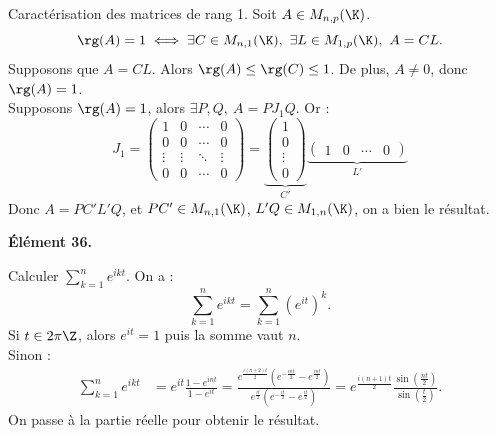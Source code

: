 \documentclass[11pt]{article}
\begin{document}
\begin{prop}{Caractérisation des matrices de rang 1.}{}
    Soit $A\in M_{n,p}(\K)$.
    \begin{equation*}
        \rg(A)=1 \iff \exists C \in M_{n,1}(\K), ~ \exists L \in M_{1,p}(\K), ~ A=CL.
    \end{equation*}
    \tcblower
    \boxed{\la} Supposons que $A=CL$. Alors $\rg(A)\leq \rg(C)\leq 1$. De plus, $A\neq0$, donc $\rg(A)=1$.\\
    \boxed{\ra} Supposons $\rg(A)=1$, alors $\exists P,Q, ~ A = PJ_1Q$. Or :
    \begin{equation*}
        J_1=\begin{pmatrix}
            1 & 0 & \cdots & 0\\
            0 & 0 & \cdots & 0\\
            \vdots & \vdots & \ddots & \vdots\\
            0 & 0 & \cdots & 0
        \end{pmatrix} = \underbrace{\begin{pmatrix}
            1\\
            0\\
            \vdots\\
            0
        \end{pmatrix}}_{C'}\underbrace{\begin{pmatrix}
            1 & 0 & \cdots & 0
        \end{pmatrix}}_{L'}
    \end{equation*}
    Donc $A=PC'L'Q$, et $PC'\in M_{n,1}(\K)$, $L'Q\in M_{1,n}(\K)$, on a bien le résultat. 
\end{prop}

\vspace*{-0.4cm}

\bf{Élément 36.}

\begin{exercice}{}{}
    Calculer $\sum_{k=1}^ne^{ikt}$.
    \tcblower
    On a :
    \begin{equation*}
        \sum_{k=1}^ne^{ikt} = \sum_{k=1}^n(e^{it})^k.
    \end{equation*}
    Si $t\in2\pi\Z$, alors $e^{it}=1$ puis la somme vaut $n$.\\
    Sinon :
    \begin{align*}
        \sum_{k=1}^ne^{ikt} &= e^{it}\frac{1-e^{int}}{1-e^{it}} = \frac{e^{\frac{i(n+2)t}{2}}\left( e^{-\frac{int}{2}} - e^{\frac{int}{2}} \right)}{e^{\frac{it}{2}}\left( e^{-\frac{it}{2}} - e^{\frac{it}{2}} \right)} = e^{\frac{i(n+1)t}{2}}\frac{\sin\left( \frac{nt}{2} \right)}{\sin\left( \frac{t}{2} \right)}.
    \end{align*}
    On passe à la partie réelle pour obtenir le résultat.
\end{exercice}
\end{document}
